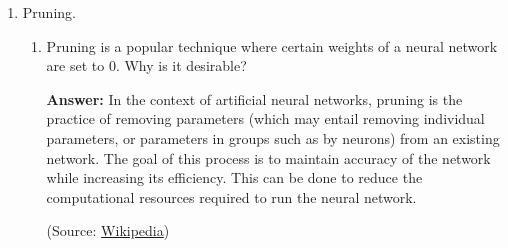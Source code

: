 \documentclass{article}
\newenvironment{QandA}{\begin{enumerate}[label=\arabic*.]}{\end{enumerate}}
\newenvironment{InnerQandA}{\begin{enumerate}[label=\roman*.]}{\end{enumerate}}
\newenvironment{answer}{\par\normalfont \textbf{Answer:}}{}
\begin{document}
\begin{QandA}
\begin{InnerQandA}
\begin{answer}
            (See more \href{https://datascience.stackexchange.com/questions/5706/what-is-the-dying-relu-problem-in-neural-networks}{here})
        \end{answer}

        \item How do we detect them in our neural network?
        \begin{answer}
            By observing the distribution of outputted values over time, we can detect neurons that have peak highly at certain values (e.g. 0).
        \end{answer}

        \item How to prevent them?
        \begin{answer}
            One way to tackle dead ReLU's is to instead use Leaky ReLU's, as they have small, but constant gradient for large negative inputs. 
        \end{answer}
    \end{InnerQandA}

    \item Pruning.
    \begin{InnerQandA}
        \item Pruning is a popular technique where certain weights of a neural network are set to 0. Why is it desirable?
        \begin{answer}
            In the context of artificial neural networks, pruning is the practice of removing parameters (which may entail removing individual parameters, or parameters in groups such as by neurons) from an existing network. The goal of this process is to maintain accuracy of the network while increasing its efficiency. This can be done to reduce the computational resources required to run the neural network.

            (Source: \href{https://en.wikipedia.org/wiki/Pruning\_(artificial\_neural\_network)}{Wikipedia})
        \end{answer}


\end{InnerQandA}
\end{QandA}
\end{document}

